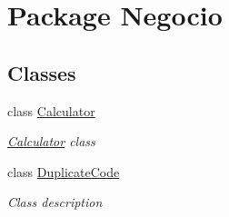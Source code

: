 \hypertarget{namespace_negocio}{\section{Package Negocio}
\label{namespace_negocio}
}
\subsection*{Classes}
\begin{DoxyCompactItemize}
\item 
class \hyperlink{class_negocio_1_1_calculator}{Calculator}
\begin{DoxyCompactList}\small\item\em \hyperlink{class_negocio_1_1_calculator}{Calculator} class \end{DoxyCompactList}\item 
class \hyperlink{class_negocio_1_1_duplicate_code}{Duplicate\-Code}
\begin{DoxyCompactList}\small\item\em Class description \end{DoxyCompactList}\end{DoxyCompactItemize}
